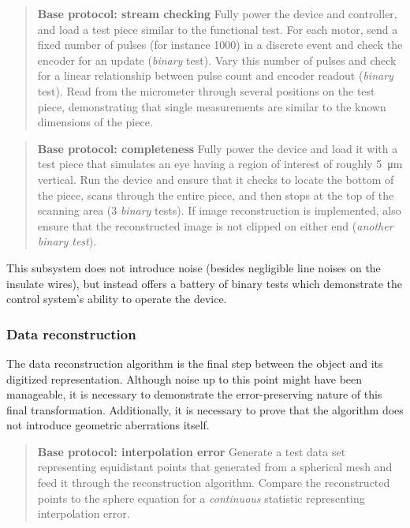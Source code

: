 \documentclass{article}
\begin{document}
\begin{quotation}
  \textbf{Base protocol: stream checking} Fully power the device and   controller, and load a test piece similar to the functional test.   For each motor, send a fixed number of pulses (for instance 1000) in   a discrete event and check the encoder for an update   (\textit{binary} test).  Vary this number of pulses and check for a   linear relationship between pulse count and encoder readout   (\textit{binary} test). Read from the micrometer through several   positions on the test piece, demonstrating that single measurements   are similar to the known dimensions of the piece.
\end{quotation}

\begin{quotation}
  \textbf{Base protocol: completeness} Fully power the device and load   it with a test piece that simulates an eye having a region of   interest of roughly \SI{5}{\micro m} vertical. Run the device and   ensure that it checks to locate the bottom of the piece, scans   through the entire piece, and then stops at the top of the scanning   area (3 \textit{binary} tests). If image reconstruction is   implemented, also ensure that the reconstructed image is not clipped   on either end (\textit{another binary test}).
\end{quotation}

This subsystem does not introduce noise (besides negligible line noises on the insulate wires), but instead offers a battery of binary tests which demonstrate the control system's ability to operate the device.

\subsubsection{Data reconstruction}
The data reconstruction algorithm is the final step between the object and its digitized representation. Although noise up to this point might have been manageable, it is necessary to demonstrate the error-preserving nature of this final transformation. Additionally, it is necessary to prove that the algorithm does not introduce geometric aberrations itself.

\begin{quotation}
  \textbf{Base protocol: interpolation error} Generate a test data set   representing equidistant points that generated from a spherical mesh   and feed it through the reconstruction algorithm. Compare the   reconstructed points to the sphere equation for a   \textit{continuous} statistic representing interpolation error.
\end{quotation}
\end{document}
